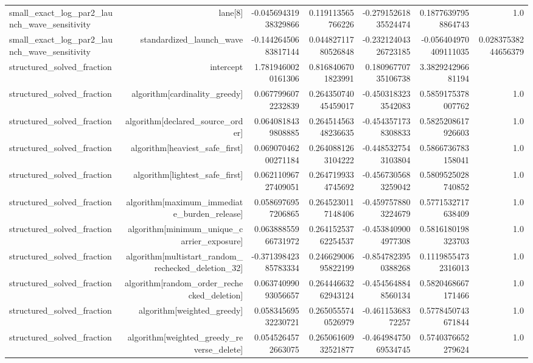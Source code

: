 {\begin{longtable}{lrrrrrr}
small\_exact\_log\_par2\_launch\_wave\_sensitivity & lane[8] & -0.04569431938329866 & 0.119113565766226 & -0.27915261835524474 & 0.18776397958864743 & 1.0 \\
small\_exact\_log\_par2\_launch\_wave\_sensitivity & standardized\_launch\_wave & -0.14426450683817144 & 0.04482711780526848 & -0.23212404326723185 & -0.056404970409111035 & 0.02837538244656379 \\
structured\_solved\_fraction & intercept & 1.7819460020161306 & 0.8168406701823991 & 0.18096770735106738 & 3.382924296681194 &  \\
structured\_solved\_fraction & algorithm[cardinality\_greedy] & 0.0677996072232839 & 0.26435074045459017 & -0.4503183233542083 & 0.5859175378007762 & 1.0 \\
structured\_solved\_fraction & algorithm[declared\_source\_order] & 0.0640818439808885 & 0.26451456348236635 & -0.4543571738308833 & 0.5825208617926603 & 1.0 \\
structured\_solved\_fraction & algorithm[heaviest\_safe\_first] & 0.06907046200271184 & 0.2640881263104222 & -0.4485327543103804 & 0.5866736783158041 & 1.0 \\
structured\_solved\_fraction & algorithm[lightest\_safe\_first] & 0.06211096727409051 & 0.2647199334745692 & -0.4567305683259042 & 0.5809525028740852 & 1.0 \\
structured\_solved\_fraction & algorithm[maximum\_immediate\_burden\_release] & 0.0586976957206865 & 0.2645230117148406 & -0.4597578803224679 & 0.5771532717638409 & 1.0 \\
structured\_solved\_fraction & algorithm[minimum\_unique\_carrier\_exposure] & 0.06388855966731972 & 0.26415253762254537 & -0.4538409004977308 & 0.5816180198323703 & 1.0 \\
structured\_solved\_fraction & algorithm[multistart\_random\_rechecked\_deletion\_32] & -0.37139842385783334 & 0.24662900695822199 & -0.8547823950388268 & 0.11198554732316013 & 1.0 \\
structured\_solved\_fraction & algorithm[random\_order\_rechecked\_deletion] & 0.06374099093056657 & 0.26444663262943124 & -0.4545648848560134 & 0.5820468667171466 & 1.0 \\
structured\_solved\_fraction & algorithm[weighted\_greedy] & 0.05834569532230721 & 0.2650555740526979 & -0.46115368372257 & 0.5778450743671844 & 1.0 \\
structured\_solved\_fraction & algorithm[weighted\_greedy\_reverse\_delete] & 0.0545264572663075 & 0.26506160932521877 & -0.46498475069534745 & 0.5740376652279624 & 1.0 \\

\end{longtable}}
